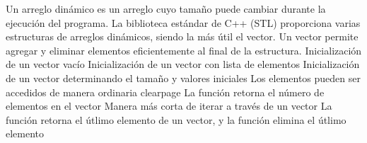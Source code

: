 \markdownRendererDocumentBegin
\markdownRendererSectionBegin
{}\markdownRendererInterblockSeparator
{}\markdownRendererSectionBegin
{}\markdownRendererInterblockSeparator
{}Un arreglo dinámico es un arreglo cuyo tamaño puede cambiar durante la ejecución del programa.\markdownRendererParagraphSeparator
{}La biblioteca estándar de C++ (STL) proporciona varias estructuras de arreglos dinámicos, siendo la más útil el vector.\markdownRendererInterblockSeparator
{}\markdownRendererSectionBegin
{}\markdownRendererInterblockSeparator
{}Un vector permite agregar y eliminar elementos eficientemente al final de la estructura.\markdownRendererParagraphSeparator
{}Inicialización de un vector vacío\markdownRendererInterblockSeparator
{}\markdownRendererInterblockSeparator
{}Inicialización de un vector con lista de elementos\markdownRendererInterblockSeparator
{}\markdownRendererInterblockSeparator
{}Inicialización de un vector determinando el tamaño y valores iniciales\markdownRendererInterblockSeparator
{}\markdownRendererInterblockSeparator
{}Los elementos pueden ser accedidos de manera ordinaria\markdownRendererInterblockSeparator
{}\markdownRendererInterblockSeparator
{}\markdownRendererDollarSign{}\markdownRendererBackslash{}clearpage\markdownRendererDollarSign{}\markdownRendererParagraphSeparator
{}La función  retorna el número de elementos en el vector\markdownRendererInterblockSeparator
{}\markdownRendererInterblockSeparator
{}Manera más corta de iterar a través de un vector\markdownRendererInterblockSeparator
{}\markdownRendererInterblockSeparator
{}La función  retorna el útlimo elemento de un vector, y la función  elimina el útlimo elemento\markdownRendererInterblockSeparator
{}\markdownRendererInterblockSeparator
